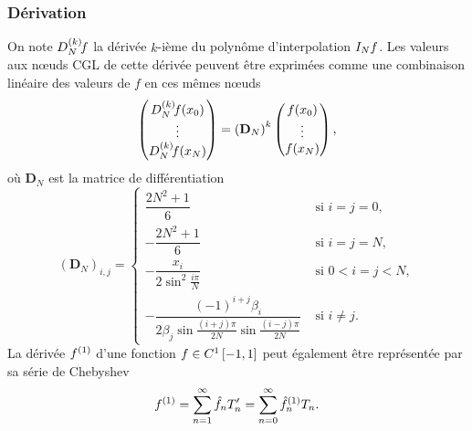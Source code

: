 \subsubsection{Dérivation}
On note $\interpderiv{f}{N}{k}$ la dérivée $k$-ième du polynôme d'interpolation $\interpolant{f}{N}$.
Les valeurs aux n\oe uds CGL de cette dérivée peuvent être %
exprimées comme une combinaison linéaire des valeurs de $f$ en ces mêmes n\oe uds
\begin{equation}
	\colvec{ 
		\interpderiv{f}{N}{k}(x_0) \\ 
		\vdots \\
		\interpderiv{f}{N}{k}(x_N)
		}
	=
	{\left( \mathbf{D}_N \right)}^k
	\colvec{ 
		f(x_0) \\ 
		\vdots \\
		f(x_N)
		},
	\label{eq:chebyshev_diff_at_cgl}
\end{equation}
où $\mathbf{D}_N$ est la matrice de différentiation \cite{canuto2006}%
\def\cvsp{2.5ex}
\begin{equation}
	\left( \mathbf{D}_N \right)_{i,j} =
	\begin{cases}
	 \dfrac{2N^2 + 1}{6} & \text{\ si\ } i = j = 0,   \\[\cvsp]
	 -\dfrac{2N^2 + 1}{6} & \text{\ si\ } i = j = N,   \\[\cvsp]
	 -\dfrac{x_i}{2 \sin^2 \frac{i \pi}{N}} & \text{\ si\ } 0 < i = j < N, \\[\cvsp]
	 -\dfrac{(-1)^{i+j} \beta_i}{2 \beta_j \sin\frac{(i+j)\pi}{2N} \sin\frac{(i-j)\pi}{2N}} & \text{\ si\ } i \neq j.
	\end{cases}
	\label{eq:chebyshev_diff_matrix}
\end{equation}
La dérivée $\deriv{f}{1}$ d'une fonction $f \in C^1\chebinterval$ peut également être représentée par sa série de Chebyshev
\begin{equation}
	\deriv{f}{1} 
	= \sum_{n=1}^{\infty} \hat{f}_n T'_n
	= \sum_{n=0}^{\infty} \deriv{\hat{f}}{1}_n T_n.
	\label{eq:chebyshev_series_derivative}
\end{equation}

